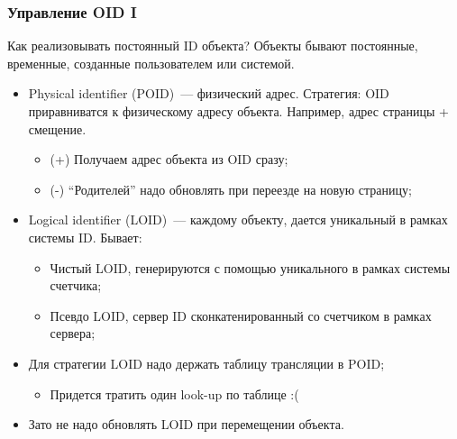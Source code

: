 \documentclass{beamer}
\begin{document}
\begin{frame}
\frametitle{Управление OID I}

Как реализовывать постоянный ID объекта? Объекты бывают постоянные, временные, созданные пользователем или системой.

\begin{itemize}
 \setlength\itemsep{1em}
  \item Physical identifier (POID)~--- физический адрес. Стратегия: OID приравниватся к физическому адресу объекта. Например, адрес страницы + смещение.
  \begin{itemize}
    \item (+) Получаем адрес объекта из OID сразу;
    \item (-) ``Родителей'' надо обновлять при переезде на новую страницу;
  \end{itemize}
  \item Logical identifier (LOID)~--- каждому объекту, дается уникальный в рамках системы ID. Бывает:
  \begin{itemize}
    \item Чистый LOID, генерируются с помощью уникального в рамках системы счетчика;
    \item Псевдо LOID, сервер ID сконкатенированный со счетчиком в рамках сервера;
  \end{itemize}
  \item Для стратегии LOID надо держать таблицу трансляции в POID;
  \begin{itemize}
    \item Придется тратить один look-up по таблице  :(
  \end{itemize}
  \item Зато не надо обновлять LOID при перемещении объекта.
\end{itemize}
\end{frame}
\end{document}
